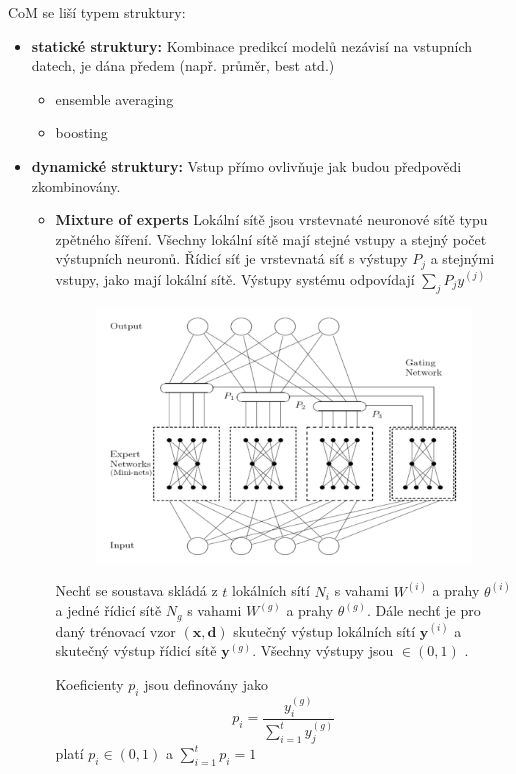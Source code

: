 \documentclass[11pt]{report} %
\renewcommand{\vec}[1]{\mathbf{#1}}
\numberwithin{equation}{section}
\begin{document}
CoM se liší typem struktury:
\begin{itemize}
	\item \textbf{statické struktury:} Kombinace predikcí modelů nezávisí na vstupních datech, je dána předem (např. průměr, best atd.)
	\begin{itemize}
		\item ensemble averaging
		\item boosting
	\end{itemize}

	\item \textbf{dynamické struktury:} Vstup přímo ovlivňuje jak budou předpovědi zkombinovány.
	\begin{itemize}
		\item \textbf{Mixture of experts}
		Lokální sítě jsou vrstevnaté neuronové sítě typu zpětného šíření. Všechny lokální sítě mají stejné vstupy a stejný počet výstupních neuronů. Řídicí síť je vrstevnatá síť s výstupy $P_j$ 
		a stejnými vstupy, jako mají lokální sítě. Výstupy systému odpovídají $\sum_j P_j y^{(j)}$
		
		\begin{figure}[H]
			\centering
			\includegraphics[scale=0.9]{img/experts.png}
		\end{figure}
	
		Nechť se soustava skládá z $t$ lokálních sítí $N_i$ s vahami $W^{(i)}$ a prahy $\theta^{(i)}$
		a jedné řídicí sítě $N_g$  s vahami $W^{(g)}$ a prahy $\theta^{(g)}$. Dále nechť je pro daný trénovací vzor $(\vec{x},\vec{d})$ skutečný výstup lokálních sítí $\vec{y}^{(i)}$ a skutečný výstup řídicí sítě $\vec{y}^{(g)}$. Všechny výstupy jsou $\in (0,1)$ .
		
		Koeficienty $p_i$ jsou definovány jako
		$$p_i = \frac{y_i^{(g)}}{\sum_{i=1}^{t}y_j^{(g)}}$$
		platí $p_i \in (0,1)$ a $\sum_{i=1}^{t} p_i = 1$
		

\end{itemize}
\end{itemize}
\end{document}
